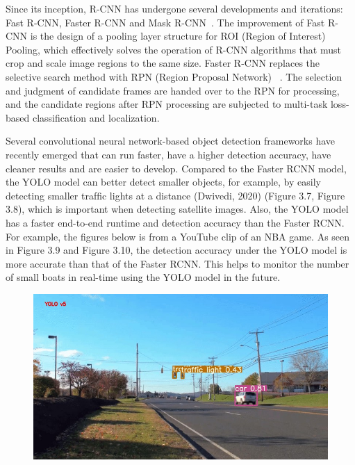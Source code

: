 Since its inception, R-CNN has undergone several developments and iterations: Fast R-CNN, Faster R-CNN and Mask R-CNN~\cite{girshick2015fast, ren2015faster, he2017mask}. The improvement of Fast R-CNN is the design of a pooling layer structure for ROI (Region of Interest) Pooling, which effectively solves the operation of R-CNN algorithms that must crop and scale image regions to the same size. Faster R-CNN replaces the selective search method with RPN (Region Proposal Network) ~\cite{ren2015faster}. The selection and judgment of candidate frames are handed over to the RPN for processing, and the candidate regions after RPN processing are subjected to multi-task loss-based classification and localization. 

Several convolutional neural network-based object detection frameworks have recently emerged that can run faster, have a higher detection accuracy, have cleaner results and are easier to develop. Compared to the Faster RCNN model, the YOLO model can better detect smaller objects, for example, by easily detecting smaller trafﬁc lights at a distance (Dwivedi, 2020) (Figure 3.7, Figure 3.8), which is important when detecting satellite images. Also, the YOLO model has a faster end-to-end runtime and detection accuracy than the Faster RCNN. For example, the ﬁgures below is from a YouTube clip of an NBA game. As seen in Figure 3.9 and Figure 3.10, the detection accuracy under the YOLO model is more accurate than that of the Faster RCNN. This helps to monitor the number of small boats in real-time using the YOLO model in the future.


\begin{figure}[p]
    \centering
    \includegraphics[scale=0.5]{img/who_wins_traffic_light_YOLO.jpg}
    \label{fig:who_wins_traffic_light_YOLO}
\end{figure}

